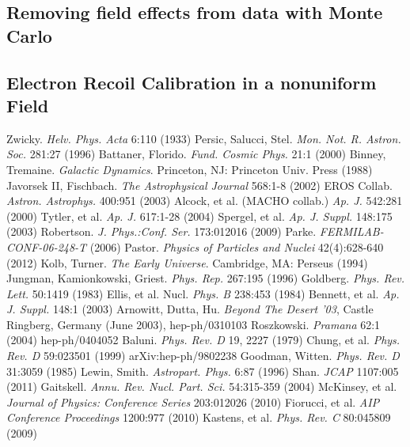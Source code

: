 \documentclass[a4paper,12pt]{article}
\begin{document}
{\subsection{Removing field effects from data with Monte Carlo}
\subsection{Electron Recoil Calibration in a nonuniform Field}


\begin{thebibliography}{1}

 Zwicky.  \emph{Helv. Phys. Acta} 6:110 (1933)
 Persic, Salucci, Stel.  \emph{Mon. Not. R. Astron. Soc.} 281:27 (1996)
 Battaner, Florido.  \emph{Fund. Cosmic Phys.} 21:1 (2000)
 Binney, Tremaine. \emph{Galactic Dynamics}. Princeton, NJ: Princeton Univ. Press (1988)
 Javorsek II, Fischbach. \emph{The Astrophysical Journal} 568:1-8 (2002)
 EROS Collab.  \emph{Astron. Astrophys.} 400:951 (2003)
 Alcock, et al. (MACHO collab.)  \emph{Ap. J.} 542:281 (2000)
 Tytler, et al. \emph{Ap. J.} 617:1-28 (2004)
 Spergel, et al. \emph{Ap. J. Suppl.} 148:175 (2003)
 Robertson. \emph{J. Phys.:Conf. Ser.} 173:012016 (2009)
 Parke.  \emph{FERMILAB-CONF-06-248-T} (2006)
 Pastor.  \emph{Physics of Particles and Nuclei} 42(4):628-640 (2012)
 Kolb, Turner. \emph{The Early Universe}.  Cambridge, MA: Perseus (1994)
 Jungman, Kamionkowski, Griest.  \emph{Phys. Rep.} 267:195 (1996)
 Goldberg.  \emph{Phys. Rev. Lett.} 50:1419 (1983)
 Ellis, et al. Nucl. \emph{Phys. B} 238:453 (1984)
 Bennett, et al. \emph{Ap. J. Suppl.} 148:1 (2003)
 Arnowitt, Dutta, Hu. \emph{Beyond The Desert '03}, Castle Ringberg, Germany (June 2003), hep-ph/0310103
 Roszkowski.  \emph{Pramana} 62:1 (2004) hep-ph/0404052
 Baluni. \emph{Phys. Rev. D} 19, 2227 (1979)
 Chung, et al.  \emph{Phys. Rev. D} 59:023501 (1999) arXiv:hep-ph/9802238
 Goodman, Witten. \emph{Phys. Rev. D} 31:3059 (1985)
 Lewin, Smith. \emph{Astropart. Phys.} 6:87 (1996)
 Shan. \emph{JCAP} 1107:005 (2011)
 Gaitskell.  \emph{Annu. Rev. Nucl. Part. Sci.} 54:315-359 (2004)
 McKinsey, et al.  \emph{Journal of Physics: Conference Series} 203:012026 (2010) 
 Fiorucci, et al.  \emph{AIP Conference Proceedings} 1200:977 (2010)
 Kastens, et al. \emph{Phys. Rev. C} 80:045809 (2009)


\end{thebibliography}}
\end{document}
